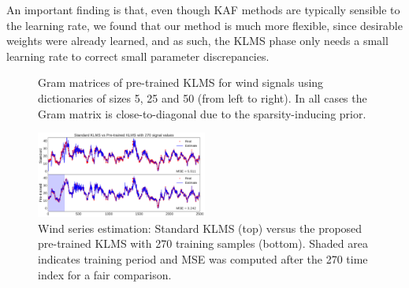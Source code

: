An important finding is that, 
even though KAF methods are typically sensible to the learning rate, we found that our method is much more flexible, since desirable weights were already learned, and as such, the KLMS phase only needs a small learning rate to correct small parameter discrepancies.
\begin{figure}[t!]
	\centering
	\caption{Gram matrices of pre-trained KLMS for wind signals using dictionaries of sizes 5, 25 and 50 (from left to right). In all cases the Gram matrix is close-to-diagonal due to the sparsity-inducing prior.}
	\label{wind-confmats}
\end{figure}

\begin{figure}[t!]
	\centering
	\includegraphics[width=0.5\textwidth]{img/Wind_Offline2.pdf}
	\caption{Wind series estimation: Standard KLMS (top) versus the proposed pre-trained KLMS with 270 training samples (bottom). Shaded area indicates training period and MSE was computed after the 270 time index for a fair comparison.}
	\label{wind-series}
\end{figure}

